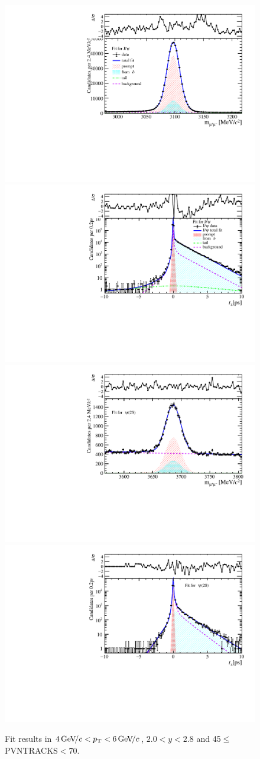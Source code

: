 \begin{figure}[H]
\begin{center}
\includegraphics[width=0.47\linewidth]{pdf/Jpsi/drawmass/n3y1pt3.pdf}
\includegraphics[width=0.47\linewidth]{pdf/Jpsi/2DFit/n3y1pt3.pdf}
\vspace*{-0.5cm}
\includegraphics[width=0.47\linewidth]{pdf/Psi2S/drawmass/n3y1pt3.pdf}
\includegraphics[width=0.47\linewidth]{pdf/Psi2S/2DFit/n3y1pt3.pdf}
\vspace*{-0.5cm}
\end{center}
\caption{Fit results in $4\text{\,Ge\kern -0.1em V\!/}c<p_{\mathrm{T}}<6\text{\,Ge\kern -0.1em V\!/}c$, $2.0<y<2.8$ and 45$\leq$PVNTRACKS$<$70.}
\label{Fitn3y1pt3}
\end{figure}
